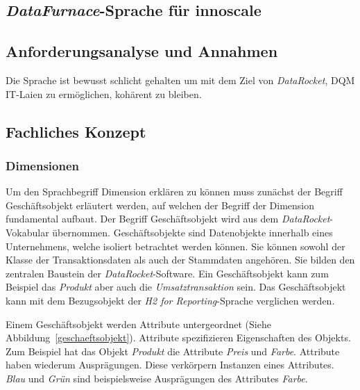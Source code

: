 \documentclass[
  language=german, %
  type=bachelor%
]{isthesis}
\begin{document}
\begin{content}
  \chapter{\textit{DataFurnace}-Sprache für innoscale}


  \section{Anforderungsanalyse und Annahmen}
  Die Sprache ist bewusst schlicht gehalten um mit dem Ziel von \textit{DataRocket},
  \acrshort{DQM} IT-Laien zu ermöglichen, kohärent zu bleiben.

  \section{Fachliches Konzept}

  \subsection{Dimensionen}
  Um den Sprachbegriff Dimension erklären zu können muss zunächst der Begriff
  Geschäftsobjekt erläutert werden, auf welchen der Begriff der Dimension
  fundamental aufbaut. Der Begriff Geschäftsobjekt wird aus dem
  \textit{DataRocket}-Vokabular übernommen. Geschäftsobjekte sind Datenobjekte
  innerhalb eines Unternehmens, welche isoliert betrachtet werden können. Sie
  können sowohl der Klasse der Transaktionsdaten als auch der Stammdaten
  angehören. Sie bilden den zentralen Baustein der
  \textit{DataRocket}-Software. Ein Geschäftsobjekt kann zum Beispiel das
  \textit{Produkt} aber auch die \textit{Umsatztransaktion} sein.  Das
  Geschäftsobjekt kann mit dem Bezugsobjekt der \textit{H2 for
  Reporting}-Sprache verglichen werden. 

  \begin{figure}[caption={Teilsprache---Geschäftsobjekt}, label={geschaeftsobjekt}]
    \resizebox{200px}{!}{}
  \end{figure}

  Einem Geschäftsobjekt werden Attribute untergeordnet (Siehe
  Abbildung~\ref{geschaeftsobjekt}). Attribute spezifizieren Eigenschaften des
  Objekts. Zum Beispiel hat das Objekt \textit{Produkt} die Attribute
  \textit{Preis} und \textit{Farbe}. Attribute haben wiederum Ausprägungen.
  Diese verkörpern Instanzen eines Attributes. \textit{Blau} und \textit{Grün}
  sind beispielsweise Ausprägungen des Attributes \textit{Farbe}.
  

\end{content}
\end{document}
